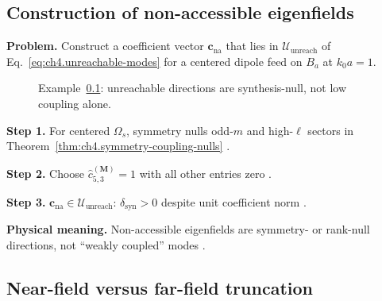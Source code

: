 \subsection{Construction of non-accessible eigenfields}
\label{sec:ch4102}

\textbf{Problem.} Construct a coefficient vector \(\mathbf{c}_{\mathrm{na}}\) that lies in \(\mathcal{U}_{\mathrm{unreach}}\) of
Eq.~\eqref{eq:ch4.unreachable-modes} for a centered dipole feed on \(B_{a}\) at \(k_{0}a=1\).

\begin{figure}[t]
\centering
{}
\caption{Example~\ref{sec:ch4102}: unreachable directions are synthesis-null, not low coupling alone.}
\label{fig:ch4.ex-unreachable-modes}
\end{figure}

\textbf{Step 1.} For centered \(\Omega_{s}\), symmetry nulls odd-\(m\) and high-\(\ell\) sectors in Theorem~\ref{thm:ch4.symmetry-coupling-nulls}
\cite{hansen1988,jackson1999,stratton1941}.

\textbf{Step 2.} Choose \(\widehat{c}_{5,3}^{(\mathbf{M})}=1\) with all other entries zero \cite{harrington2001}.

\textbf{Step 3.} \(\mathbf{c}_{\mathrm{na}}\in\mathcal{U}_{\mathrm{unreach}}\): \(\delta_{\mathrm{syn}}>0\) despite unit coefficient norm
\cite{devaney2004,stratton1941}.

\textbf{Physical meaning.} Non-accessible eigenfields are symmetry- or rank-null directions, not ``weakly coupled'' modes \cite{hansen1988}.


\subsection{Near-field versus far-field truncation}
\label{sec:ch4103}


